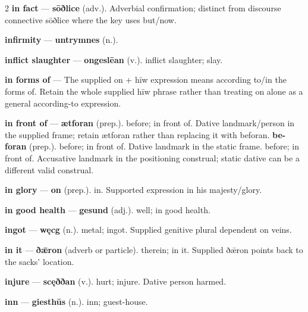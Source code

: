 \begin{multicols}{2}
\textbf{in fact} — \textbf{sōðlice} (adv.). Adverbial confirmation; distinct from discourse connective sōðlice where the key uses but/now.\par
\textbf{infirmity} — \textbf{untrymnes} (n.).\par
\textbf{inflict slaughter} — \textbf{ongeslēan} (v.). inflict slaughter; slay.\par
\textbf{in forms of} — The supplied on + hīw expression means according to/in the forms of. Retain the whole supplied hīw phrase rather than treating on alone as a general according-to expression.\par
\textbf{in front of} — \textbf{ætforan} (prep.). before; in front of. Dative landmark/person in the supplied frame; retain ætforan rather than replacing it with beforan. \textbf{be-foran} (prep.). before; in front of. Dative landmark in the static frame. before; in front of. Accusative landmark in the positioning construal; static dative can be a different valid construal.\par
\textbf{in glory} — \textbf{on} (prep.). in. Supported expression in his majesty/glory.\par
\textbf{in good health} — \textbf{gesund} (adj.). well; in good health.\par
\textbf{ingot} — \textbf{węcg} (n.). metal; ingot. Supplied genitive plural dependent on veins.\par
\textbf{in it} — \textbf{ðǣron} (adverb or particle). therein; in it. Supplied ðǣron points back to the sacks' location.\par
\textbf{injure} — \textbf{scęððan} (v.). hurt; injure. Dative person harmed.\par
\textbf{inn} — \textbf{giesthūs} (n.). inn; guest-house.\par

\end{multicols}
